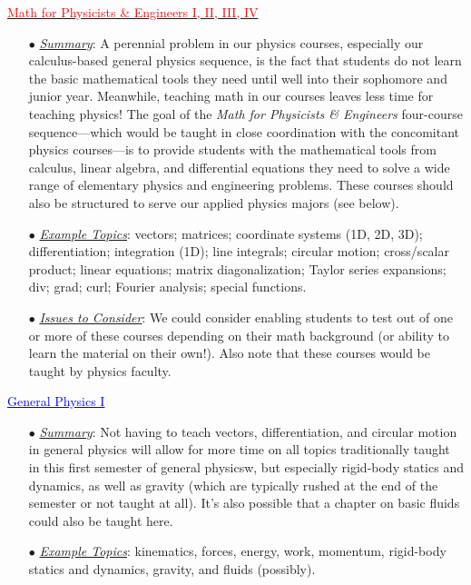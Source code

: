 \documentclass[12pt,preprint]{aastex}
\newcommand{\red}[1]{\textcolor{red}{#1}}
\newcommand{\blue}[1]{\textcolor{blue}{#1}}
\begin{document}
\vspace{-4mm}
\begin{itemize*}
\item{\underline{\red{Math for Physicists \& Engineers I, II, III, IV}}
  \begin{itemize}
    \item[$\bullet$]{\underline{\em Summary}: A perennial problem in our physics
      courses, especially our calculus-based general physics sequence, is the
      fact that students do not learn the basic mathematical tools they need
      until well into their sophomore and junior year.  Meanwhile, teaching math
      in our courses leaves less time for teaching physics!  The goal of the
      {\em Math for Physicists \& Engineers} four-course sequence---which would
      be taught in close coordination with the concomitant physics courses---is
      to provide students with the mathematical tools from calculus, linear
      algebra, and differential equations they need to solve a wide range of
      elementary physics and engineering problems.  These courses should also be
      structured to serve our applied physics majors (see below).}
    \item[$\bullet$]{\underline{\em Example Topics}: vectors; matrices;
      coordinate systems (1D, 2D, 3D); differentiation; integration (1D); line
      integrals; circular motion; cross/scalar product; linear equations; matrix
      diagonalization; Taylor series expansions; div; grad; curl; Fourier
      analysis; special functions.}
    \item[$\bullet$]{\underline{\em Issues to Consider}: We could consider
      enabling students to test out of one or more of these courses depending on
      their math background (or ability to learn the material on their own!).
      Also note that these courses would be taught by physics faculty.}
  \end{itemize}
}
\item{\underline{\blue{General Physics I}}
  \begin{itemize}
    \item[$\bullet$]{\underline{\em Summary}: Not having to teach vectors,
      differentiation, and circular motion in general physics will allow for
      more time on all topics traditionally taught in this first semester of
      general physicsw, but especially rigid-body statics and dynamics, as well
      as gravity (which are typically rushed at the end of the semester or not
      taught at all).  It's also possible that a chapter on basic fluids could
      also be taught here.}
    \item[$\bullet$]{\underline{\em Example Topics}: kinematics, forces,
      energy, work, momentum, rigid-body statics and dynamics, gravity, and
      fluids (possibly).}
  \end{itemize}
}
  

\end{itemize*}
\end{document}
